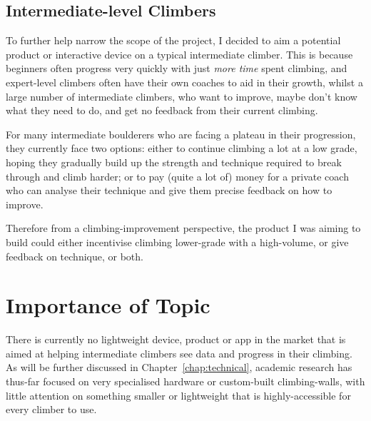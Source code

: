 \subsection{Intermediate-level Climbers}
To further help narrow the scope of the project, I decided to aim a potential product or interactive device on a typical intermediate climber.
This is because beginners often progress very quickly with just \textit{more time} spent climbing, and expert-level climbers often have their own coaches to aid in their growth, whilst a large number of intermediate climbers, who want to improve, maybe don't know what they need to do, and get no feedback from their current climbing.

For many intermediate boulderers who are facing a plateau in their progression, they currently face two options: either to continue climbing a lot at a low grade, hoping they gradually build up the strength and technique required to break through and climb harder; or to pay (quite a lot of) money for a private coach who can analyse their technique and give them precise feedback on how to improve.

Therefore from a climbing-improvement perspective, the product I was aiming to build could either incentivise climbing lower-grade with a high-volume, or give feedback on technique, or both.



\section{Importance of Topic}



There is currently no lightweight device, product or app in the market that is aimed at helping intermediate climbers see data and progress in their climbing.
As will be further discussed in Chapter~\ref{chap:technical}, academic research has thus-far focused on very specialised hardware or custom-built climbing-walls, with little attention on something smaller or lightweight that is highly-accessible for every climber to use.


